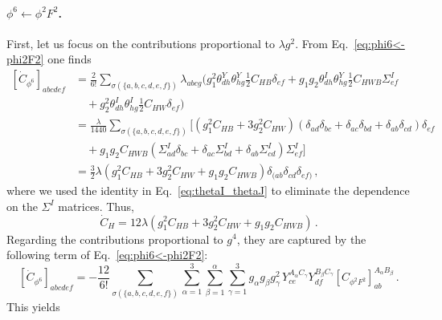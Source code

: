 \paragraph{\texorpdfstring{$\phi^6 \leftarrow \phi^2 F^2$}{phi6fromphi2F2}.}
First, let us focus on the contributions proportional to $\lambda g^2$.
From Eq.\ \eqref{eq:phi6<-phi2F2} one finds
\begin{align}
    \left[\dot C_{\phi^6}\right]_{abcdef} &= \frac{2}{6!}\sum_{\sigma(\{a,b,c,d,e,f\})}\lambda_{abcg} (g_1^2 \theta^Y_{dh}\theta^Y_{hg}\frac{1}{2}C_{HB}\delta_{ef}
    + g_1 g_2 \theta^I_{dh}\theta^Y_{hg}\frac{1}{2}C_{HWB}\Sigma^I_{ef}\nonumber \\
    &\quad
    + g_2^2 \theta^I_{dh}\theta^I_{hg}\frac{1}{2}C_{HW}\delta_{ef})\nonumber \\
    &= \frac{\lambda}{1440}\sum_{\sigma(\{a,b,c,d,e,f\})}[(g_1^2 C_{HB}+3g_2^2C_{HW})(\delta_{ad}\delta_{bc}+\delta_{ac}\delta_{bd}+\delta_{ab}\delta_{cd})\delta_{ef} \nonumber \\
    &\quad+ g_1 g_2 C_{HWB}(\Sigma^I_{ad}\delta_{bc}+\delta_{ac}\Sigma^I_{bd}+\delta_{ab}\Sigma^I_{cd})\Sigma^I_{ef}]\nonumber \\
    &= \frac{3}{2}\lambda(g_1^2 C_{HB} + 3 g_2^2 C_{HW} + g_1 g_2 C_{HWB})\delta_{(ab}\delta_{cd}\delta_{ef)}\,,
\end{align}
where we used the identity in Eq.~\eqref{eq:thetaI_thetaJ} to eliminate the dependence on the $\Sigma^I$ matrices.
Thus,
\begin{equation}
    \dot C_H = 12 \lambda(g_1^2 C_{HB} + 3 g_2^2 C_{HW} + g_1 g_2 C_{HWB})\,.
\end{equation}
Regarding the contributions proportional to $g^4$, they are captured by the following term of Eq.~\eqref{eq:phi6<-phi2F2}:
\begin{equation}
    \left[\dot C_{\phi^6}\right]_{abcdef} = - \frac{12}{6!}\sum_{\sigma(\{a,b,c,d,e,f\})} \sum_{\alpha=1}^{3}\sum_{\beta=1}^{\alpha}\sum_{\gamma=1}^{3} g_\alpha g_\beta g_\gamma^2 \,Y_{ce}^{A_\alpha C_\gamma} Y_{df}^{B_\beta C_\gamma} \left[C_{\phi^2 F^2}\right]_{ab}^{A_\alpha B_\beta}\,.
\end{equation}
This yields

